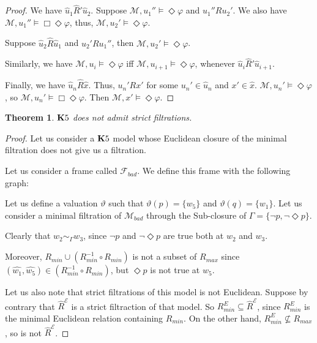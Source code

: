 \documentclass[a4paper]{article}
\theoremstyle{defin}
\theoremstyle{theorem}
\newtheorem{theorem}{Theorem}
\theoremstyle{prop}
\theoremstyle{lemma}
\theoremstyle{fact}
\theoremstyle{ex}
\theoremstyle{col}
\theoremstyle{claim}
\begin{document}
\begin{proof}
  We have $\hat{u}_1 \widehat{R}' \hat{u}_2$. Suppose $\mathcal{M}, u_1'' \models \Diamond \varphi$ and $u_1'' R u_2'$.
  We also have $\mathcal{M}, u_1'' \models \Box \Diamond \varphi$, thus, $\mathcal{M}, u_2' \models \Diamond \varphi$.

  Suppose $\hat{u}_2 \widehat{R} \hat{u}_1$ and $u_2' R u_1''$, then $\mathcal{M}, u_2' \models \Diamond \varphi$.

  Similarly, we have $\mathcal{M}, u_i \models \Diamond \varphi$ iff $\mathcal{M}, u_{i + 1} \models \Diamond \varphi$, whenever $\hat{u}_i \widehat{R}' \hat{u}_{i + 1}$.

  Finally, we have $\hat{u}_n \widehat{R} \hat{x}$. Thus, $u_n' R x'$ for some $u_n' \in \hat{u}_n$ and $x' \in \hat{x}$. $\mathcal{M}, u_n' \models \Diamond \varphi$, so $\mathcal{M}, u_n' \models \Box \Diamond \varphi$. Then $\mathcal{M}, x' \models \Diamond \varphi$.
\end{proof}

\begin{theorem}\label{sad}
  ${\bf K}5$ does not admit strict filtrations.
\end{theorem}

\begin{proof}
  Let us consider a ${\bf K}5$ model whose Euclidean closure of the minimal filtration does not give us a filtration.

  Let us consider a frame called $\mathcal{F}_{bad}$. We define this frame with the following graph:

\vspace{\baselineskip}


Let us define a valuation $\vartheta$ such that $\vartheta(p) = \{ w_5\}$ and $\vartheta(q) = \{ w_1\}$. Let us consider a minimal filtration of $\mathcal{M}_{bad}$ through the Sub-closure of $\Gamma = \{ \neg p, \neg \Diamond p\}$.

Clearly that $w_2 \sim_{\Gamma} w_3$, since $\neg p$ and $\neg \Diamond p$ are true both at $w_2$ and $w_3$.

Moreover, $R_{min} \cup (R_{min}^{-1} \circ R_{min})$ is not a subset of $R_{max}$ since $(\hat{w_1}, \hat{w_5}) \in (R_{min}^{-1} \circ R_{min})$, but $\Diamond p$ is not true at $w_5$.

Let us also note that strict filtrations of this model is not Euclidean.
Suppose by contrary that $\widehat{R}^{\mathcal{E}}$ is a strict filtraction of that model. So $R_{min}^E \subseteq \widehat{R}^{\mathcal{E}}$, since $R_{min}^E$ is the minimal Euclidean relation containing $R_{min}$. On the other hand, $R_{min}^E \not\subseteq R_{max}$, so is not $\widehat{R}^{\mathcal{E}}$.

\end{proof}
\end{document}
